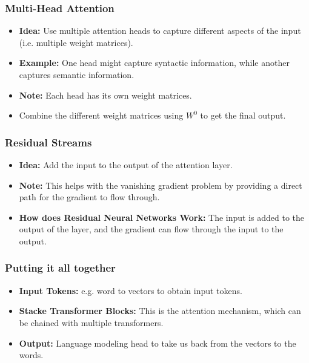 \subsubsection{Multi-Head Attention}
\begin{definition}
    \begin{itemize}
        \item \textbf{Idea:} Use multiple attention heads to capture different aspects of the input (i.e. multiple weight matrices).
        \item \textbf{Example:} One head might capture syntactic information, while another captures semantic information.
        \item \textbf{Note:} Each head has its own weight matrices.
    \end{itemize}
    \begin{itemize}
        \item Combine the different weight matrices using $W^0$ to get the final output.
    \end{itemize}
\end{definition}

\subsubsection{Residual Streams}
\begin{definition}
    \begin{itemize}
        \item \textbf{Idea:} Add the input to the output of the attention layer.
        \item \textbf{Note:} This helps with the vanishing gradient problem by providing a direct path for the gradient to flow through.
        \item \textbf{How does Residual Neural Networks Work:} The input is added to the output of the layer, and the gradient can flow through the input to the output. 
    \end{itemize}
\end{definition}

\subsubsection{Putting it all together}
\begin{definition}
    \begin{itemize}
        \item \textbf{Input Tokens:} e.g. word to vectors to obtain input tokens.
        \item \textbf{Stacke Transformer Blocks:} This is the attention mechanism, which can be chained with multiple transformers.
        \item \textbf{Output:} Language modeling head to take us back from the vectors to the words. 
        \itemize
    \end{itemize}
\end{definition}

